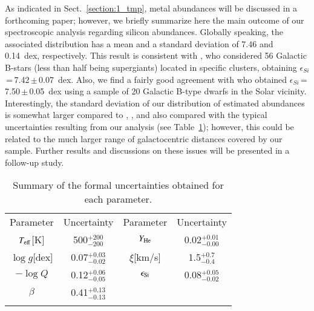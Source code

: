 \documentclass{aa}
\newcommand{\vmic}{$\xi$\xspace}
\newcommand{\Teff}{\mbox{$T_{\rm eff}$}\xspace}
\newcommand{\logg}{\mbox{$\log g$}\xspace}
\newcommand{\logQ}{\mbox{$\log Q$}\xspace}
\newcommand{\He}{$Y_{\rm He}$\xspace}
\begin{document}
As indicated in Sect.~\ref{section:1_tmp}, metal abundances will be discussed in a forthcoming paper; however, we briefly summarize here the main outcome of our spectroscopic analysis regarding silicon abundances. Globally speaking, the associated distribution has a mean and a standard deviation of 7.46 and 0.14~dex, respectively. This result is consistent with \citet{hunter09}, who considered 56 Galactic B-stars (less than half being supergiants) located in specific clusters, obtaining $\epsilon_{Si}$\,=\,7.42\,$\pm$\,0.07~dex. Also, we find a fairly good agreement with \citet{nieva12} who obtained $\epsilon_{Si}$\,=\,7.50\,$\pm$\,0.05~dex using a sample of 20 Galactic B-type dwarfs in the Solar vicinity. Interestingly, the standard deviation of our distribution of estimated abundances is somewhat larger compared to \citet{hunter09}, \citet{nieva12}, and also compared with the typical uncertainties resulting from our analysis (see Table~\ref{tab:errors}); however, this could be related to the much larger range of galactocentric distances covered by our sample. Further results and discussions on these issues will be presented in a follow-up study.

\begin{table}[!t]
 \centering
\caption[]{Summary of the formal uncertainties obtained for each parameter.} 
 \label{tab:errors}
 \begin{tabular}{cccc}
 \hline
 \hline
    \noalign{\smallskip}
     Parameter & Uncertainty & Parameter & Uncertainty \\
    \noalign{\smallskip}
    \hline
    \noalign{\medskip}
    \Teff [K]       & 500$^{+200}_{-200}$ & \He  & 0.02$^{+0.01}_{-0.00}$ \\  
    \noalign{\medskip}
    \logg [dex]     & 0.07$^{+0.03}_{-0.02}$ & \vmic [km/s]   & 1.5$^{+0.7}_{-0.4}$   \\
    \noalign{\medskip}
    $-$\logQ        & 0.12$^{+0.06}_{-0.05}$ & $\epsilon_{\rm Si}$ & 0.08$^{+0.05}_{-0.02}$  \\ 
    \noalign{\medskip}
    $\beta$         & 0.41$^{+0.13}_{-0.13}$  & & \\
    \noalign{\medskip}\hline
 \end{tabular}
\end{table}


\end{document}

